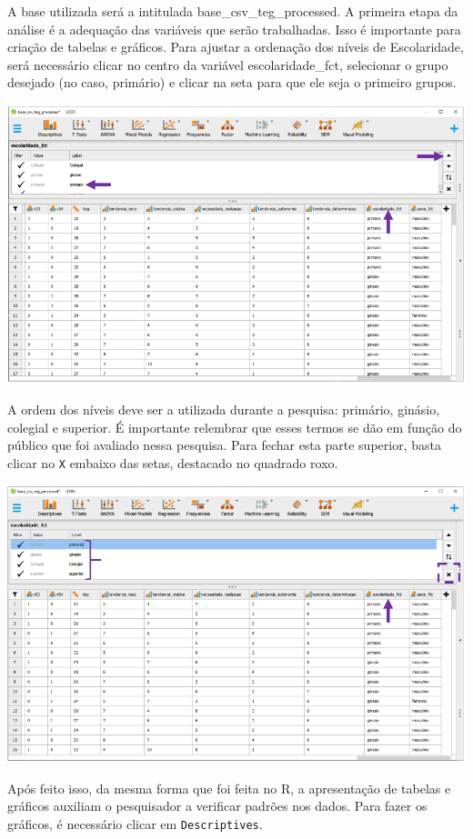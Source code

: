 \documentclass[
]{book}
\begin{document}
A base utilizada será a intitulada base\_csv\_teg\_processed. A primeira etapa da análise é a adequação das variáveis que serão trabalhadas. Isso é importante para criação de tabelas e gráficos. Para ajustar a ordenação dos níveis de Escolaridade, será necessário clicar no centro da variável escolaridade\_fct, selecionar o grupo desejado (no caso, primário) e clicar na seta para que ele seja o primeiro grupos.

\includegraphics{./img/cap_anova_ordem_variaveis.png}

A ordem dos níveis deve ser a utilizada durante a pesquisa: primário, ginásio, colegial e superior. É importante relembrar que esses termos se dão em função do público que foi avaliado nessa pesquisa. Para fechar esta parte superior, basta clicar no \texttt{X} embaixo das setas, destacado no quadrado roxo.

\includegraphics{./img/cap_anova_ordem_variaveis2.png}

Após feito isso, da mesma forma que foi feita no R, a apresentação de tabelas e gráficos auxiliam o pesquisador a verificar padrões nos dados. Para fazer os gráficos, é necessário clicar em \texttt{Descriptives}.
\end{document}
